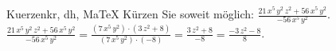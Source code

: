 \begin{MAufgabe}{Kuerzen}{kr, dh, MaTeX}
K\"urzen Sie soweit m\"oglich: $\frac{21\, x^5\, y^2\, z^2 + 56\, x^5\, y^2}{- 56\, x^5\, y^2}$.\\ 
\ifLsg\MLoesung
\quad $\frac{21\, x^5\, y^2\, z^2 + 56\, x^5\, y^2}{- 56\, x^5\, y^2}=\frac{(7\, x^5\, y^2)\cdot(3\, z^2 + 8)}{(7\, x^5\, y^2)\cdot(-8)}=\frac{3\, z^2 + 8}{-8}=\frac{ - 3\, z^2 - 8}{8}$.\else\relax\fi
 \end{MAufgabe}